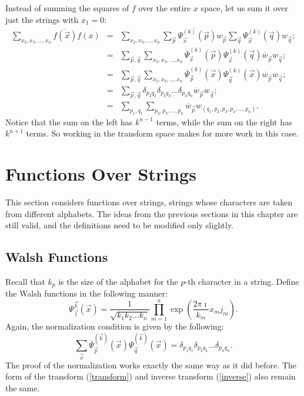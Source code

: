 Instead of summing the squares of $f$ over the entire $x$ space, let us
sum it over just the strings with $x_1=0$:
\begin{eqnarray}
\sum_{x_2,x_3,\ldots,x_n}{\overline{f(\vec x)} f(x)}&=&
        \sum_{x_2,x_3,\ldots,x_n}{\overline{\sum_{\vec p}{\Psi^{(k)}_{\vec x}(\vec p) w_{\vec p}}}
                \sum_{\vec q}{\Psi^{(k)}_{\vec x}(\vec q) w_{\vec q}}}; \nonumber \\
        &=& \sum_{\vec p,\vec q}\sum_{x_2,x_3,\ldots,x_n} {\overline{\Psi}^{(k)}_{\vec x}(\vec p)
                \Psi^{(k)}_{\vec x}(\vec q)
                \overline{w}_{\vec p} w_{\vec q} }; \nonumber \\
        &=& \sum_{\vec p,\vec q}\sum_{x_2,x_3,\ldots,x_n} {\overline{\Psi}^{(k)}_{\vec p}{(\vec x)}
                \Psi^{(k)}_{\vec q}(\vec x)
                \overline{w}_{\vec p} w_{\vec q} }; \nonumber \\
        &=& \sum_{\vec p,\vec q} \delta_{p_2 q_2} \delta_{p_3 q_3} \ldots
		\delta_{p_n q_n} \overline{w}_{\vec p} w_{\vec q}; \nonumber \\
	&=& \sum_{p_1,q_1} \sum_{p_2,p_3,\ldots,p_n}
		\overline{w}_{\vec p} w_{(q_1,p_2,p_3,p_4,\ldots,p_n)}.
			\label{vartwo}
\end{eqnarray}
Notice that the sum on the left has $k^{n-1}$ terms, while the sum on
the right has $k^{n+1}$ terms.  So working in the transform space makes for
more work in this case.  

\section{Functions Over \veckary Strings}
This section considers functions over \veckary strings,
strings whose characters are taken from different alphabets.
The ideas from the previous sections in this chapter are still valid, and the
definitions need to be modified only slightly.

\subsection{\veckary Walsh Functions}
Recall that $k_p$ is the size of the alphabet for the $p$-th character in
a string.  Define the \veckary Walsh functions in the following manner:
\begin{equation}
\Psi^{\vec{k}}_{\vec \jmath}(\vec{x})=
	\frac{1}{\sqrt{k_1 k_2 \ldots k_n}}
	\prod_{m=1}^n {\exp(\frac{2 \pi \imath}{k_m} x_m j_m)}.
\end{equation}
Again, the normalization condition is given by the following:
\begin{equation}
\sum_{\vec x}{ {\overline{\Psi}^{(\vec{k})}_{\vec p}(\vec{x})}
	\Psi^{(\vec{k})}_{\vec q}(\vec{x})}=
		\delta_{p_1 q_1} \delta_{p_2 q_2} \ldots
		\delta_{p_n q_n}.
\end{equation}
The proof of the normalization works exactly the same way as it did
before.  The form of the transform (\ref{transform}) and inverse transform 
(\ref{inverse}) also remain the same.

